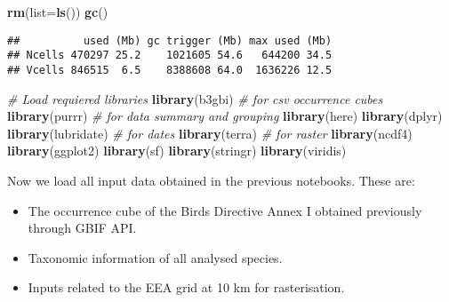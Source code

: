 \documentclass[
]{article}
\newenvironment{Shaded}{\begin{snugshade}}{\end{snugshade}}
\newcommand{\AttributeTok}[1]{\textcolor[rgb]{0.13,0.29,0.53}{#1}}
\newcommand{\CommentTok}[1]{\textcolor[rgb]{0.56,0.35,0.01}{\textit{#1}}}
\newcommand{\FunctionTok}[1]{\textcolor[rgb]{0.13,0.29,0.53}{\textbf{#1}}}
\newcommand{\NormalTok}[1]{#1}
\providecommand{\tightlist}{%
  \setlength{\itemsep}{0pt}\setlength{\parskip}{0pt}}
\begin{document}
\begin{Shaded}
\begin{Highlighting}[]
\FunctionTok{rm}\NormalTok{(}\AttributeTok{list=}\FunctionTok{ls}\NormalTok{())}
\FunctionTok{gc}\NormalTok{()}
\end{Highlighting}
\end{Shaded}

\begin{verbatim}
##          used (Mb) gc trigger (Mb) max used (Mb)
## Ncells 470297 25.2    1021605 54.6   644200 34.5
## Vcells 846515  6.5    8388608 64.0  1636226 12.5
\end{verbatim}

\begin{Shaded}
\begin{Highlighting}[]
\CommentTok{\# Load requiered libraries}
\FunctionTok{library}\NormalTok{(b3gbi) }\CommentTok{\# for csv occurrence cubes}
\FunctionTok{library}\NormalTok{(purrr) }\CommentTok{\# for data summary and grouping}
\FunctionTok{library}\NormalTok{(here)}
\FunctionTok{library}\NormalTok{(dplyr)}
\FunctionTok{library}\NormalTok{(lubridate) }\CommentTok{\# for dates}
\FunctionTok{library}\NormalTok{(terra) }\CommentTok{\# for raster}
\FunctionTok{library}\NormalTok{(ncdf4)}
\FunctionTok{library}\NormalTok{(ggplot2)}
\FunctionTok{library}\NormalTok{(sf)}
\FunctionTok{library}\NormalTok{(stringr)}
\FunctionTok{library}\NormalTok{(viridis)}
\end{Highlighting}
\end{Shaded}

Now we load all input data obtained in the previous notebooks. These
are:

\begin{itemize}
\tightlist
\item
  The occurrence cube of the Birds Directive Annex I obtained previously
  through GBIF API.
\item
  Taxonomic information of all analysed species.
\item
  Inputs related to the EEA grid at 10 km for rasterisation.
\end{itemize}
\end{document}
